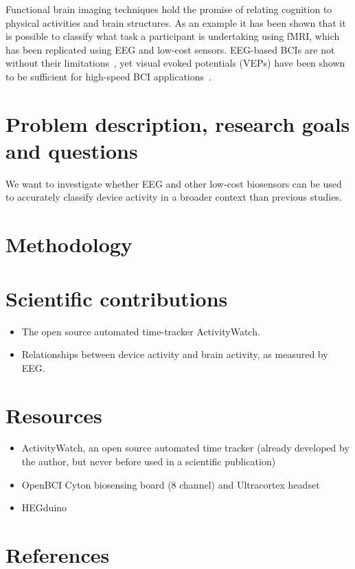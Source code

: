 \documentclass{IEEEtran}
\begin{document}

Functional brain imaging techniques hold the promise of relating cognition to physical activities and brain structures. As an example it has been shown that it is possible to classify what task a participant is undertaking using fMRI\cite{floyd_decoding_2017}, which has been replicated using EEG and low-cost sensors\cite{fucci_replication_2019}. EEG-based BCIs are not without their limitations~\cite{mcfarland_eeg-based_2017}, yet visual evoked potentials (VEPs) have been shown to be sufficient for high-speed BCI applications~\cite{spuler_high-speed_2017}.


\section{Problem description, research goals and questions}

We want to investigate whether EEG and other low-cost biosensors can be used to accurately classify device activity in a broader context than previous studies.


\section{Methodology}

\section{Scientific contributions}

\begin{itemize}
  \item The open source automated time-tracker ActivityWatch.
  \item Relationships between device activity and brain activity, as measured by EEG\@.
\end{itemize}

\section{Resources}

\begin{itemize}
  \item ActivityWatch, an open source automated time tracker (already developed by the author, but never before used in a scientific publication)
  \item OpenBCI Cyton biosensing board (8 channel) and Ultracortex headset
  \item HEGduino
\end{itemize}


\section{References}

\printbibliography{}
\end{document}
